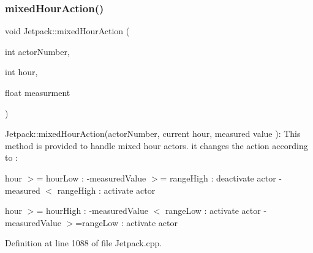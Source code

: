 \subsubsection{\texorpdfstring{mixed\+Hour\+Action()}{mixedHourAction()}}
{\footnotesize\ttfamily void Jetpack\+::mixed\+Hour\+Action (\begin{DoxyParamCaption}\item[{int}]{actor\+Number,  }\item[{int}]{hour,  }\item[{float}]{measurment }\end{DoxyParamCaption})}

Jetpack\+::mixed\+Hour\+Action(actor\+Number, current hour, measured value )\+: This method is provided to handle mixed hour actors. it changes the action according to \+:

hour $>$= hour\+Low \+: -\/measured\+Value $>$= range\+High \+: deactivate actor -\/measured $<$ range\+High \+: activate actor

hour $>$= hour\+High \+: -\/measured\+Value $<$ range\+Low \+: activate actor -\/measured\+Value $>$=range\+Low \+: activate actor 

Definition at line 1088 of file Jetpack.\+cpp.


